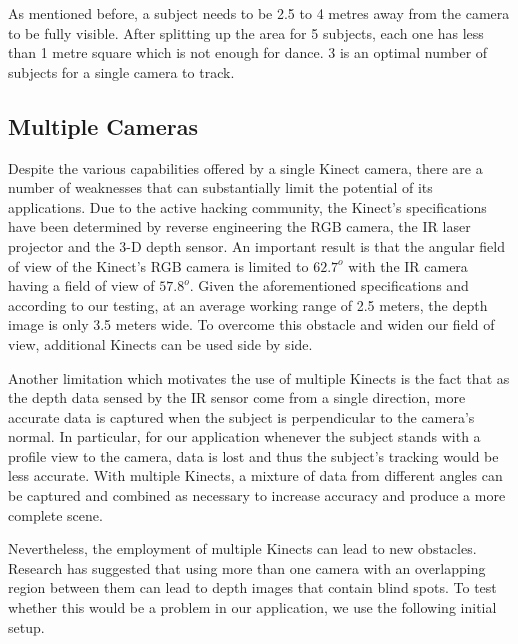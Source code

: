 \documentclass[10pt]{article}
\begin{document}
As mentioned before, a subject needs to be 2.5 to 4 metres away from the camera to be fully visible. After splitting up the area for 5 subjects, each one has less than 1 metre square which is not enough for dance. 3 is an optimal number of subjects for a single camera to track.\\


\subsection{Multiple Cameras}
\noindent
Despite the various capabilities offered by a single Kinect camera, there are a number of weaknesses that can substantially limit the potential of its applications. Due to the active hacking community, the Kinect's specifications have been determined by reverse engineering the RGB camera, the IR laser projector and the 3-D depth sensor. An important result is that the angular field of view of the Kinect's RGB camera is limited to $62.7^o$ with the IR camera having a field of view of $57.8^o$. Given the aforementioned specifications and according to our testing, at an average working range of 2.5 meters, the depth image is only 3.5 meters wide. To overcome this obstacle and widen our field of view, additional Kinects can be used side by side. 

Another limitation which motivates the use of multiple Kinects is the fact that as the depth data sensed by the IR sensor come from a single direction, more accurate data is captured when the subject is perpendicular to the camera's normal. In particular, for our application whenever the subject stands with a profile view to the camera, data is lost and thus the subject's tracking would be less accurate. With multiple Kinects, a mixture of data from different angles can be captured and combined as necessary to increase accuracy and produce a more complete scene.

Nevertheless, the employment of multiple Kinects can lead to new obstacles. Research has suggested that using more than one camera with an overlapping region between them can lead to depth images that contain blind spots. To test whether this would be a problem in our application, we use the following initial setup.
\end{document}
